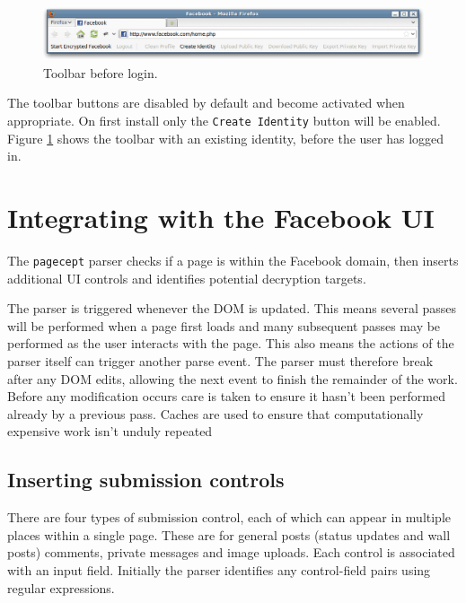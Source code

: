     \begin{figure}[tbph]
        \begin{center}
                \includegraphics[width=12cm]{screens/toolbar.png}
            \caption{Toolbar before login.}
            \label{scn:toolbar}
        \end{center}
    \end{figure}
    
The toolbar buttons are disabled by default and become activated when appropriate. On first install only the {\tt Create Identity} button will be enabled. Figure \ref{scn:toolbar} shows the toolbar with an existing identity, before the user has logged in. 


\FloatBarrier
\section{Integrating with the Facebook UI}

The {\tt pagecept} parser checks if a page is within the Facebook domain, then inserts additional UI controls and identifies potential decryption targets.

The parser is triggered whenever the \ac{DOM} is updated. This means several passes will be performed when a page first loads and many subsequent passes may be performed as the user interacts with the page. This also means the actions of the parser itself can trigger another parse event. The parser must therefore break after any \ac{DOM} edits, allowing the next event to finish the remainder of the work. Before any modification occurs care is taken to ensure it hasn't been performed already by a previous pass. Caches are used to ensure that computationally expensive work isn't unduly repeated


\subsection{Inserting submission controls}

There are four types of submission control, each of which can appear in multiple places within a single page. These are for general posts (status updates and wall posts) comments, private messages and image uploads. Each control is associated with an input field. Initially the parser identifies any control-field pairs using regular expressions.

